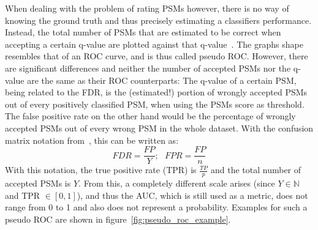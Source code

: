 	When dealing with the problem of rating PSMs however, there is no way of knowing the ground truth and thus precisely estimating a classifiers performance. Instead, the total number of PSMs that are estimated to be correct when accepting a certain q-value are plotted against that q-value~\cite{Kll2007, Granholm2012}. The graphs shape resembles that of an ROC curve, and is thus called pseudo ROC. However, there are significant differences and neither the number of accepted PSMs nor the q-value are the same as their ROC counterparts: The q-value of a certain PSM, being related to the FDR, is the (estimated!) portion of wrongly accepted PSMs out of every positively classified PSM, when using the PSMs score as threshold. The false positive rate on the other hand would be the percentage of wrongly accepted PSMs out of every wrong PSM in the whole dataset. With the confusion matrix notation from~\citet{Fawcett2006}, this can be written as:\\
	\begin{equation}
		FDR = \frac{FP}{Y};~~~ FPR = \frac{FP}{n}
	\end{equation}
	With this notation, the true positive rate (TPR) is $\frac{TP}{p}$ and the total number of accepted PSMs is $Y$. From this, a completely different scale arises (since $Y \in \mathbb{N}$ and TPR $\in [0,1]$), and thus the AUC, which is still used as a metric, does not range from 0 to 1 and also does not represent a probability. Examples for such a pseudo ROC are shown in figure~\ref{fig:pseudo_roc_example}.
	\renewcommand{\baselinestretch}{0.9}
